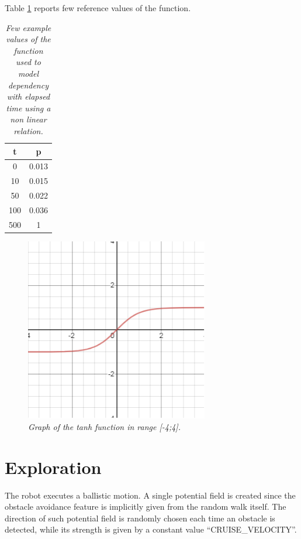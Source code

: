 \noindent
Table \ref{tab:f-values} reports few reference values of the function.

\begin{table}[H]
\centering
\begin{tabular}{| c | c |}

\hline
t & p \\
\hline
 0  & 0.013 \\
 10 & 0.015 \\
 50 & 0.022 \\
100 & 0.036 \\
500 & 1 \\
\hline

\end{tabular}
\caption{\label{tab:f-values}\textit{Few example values of the function used to model dependency with elapsed time using a non linear relation.}}
\end{table}

\begin{figure}[H]
\centering
\includegraphics[width=8cm, keepaspectratio]{images/tanh.png}
\caption{\textit{Graph of the tanh function in range [-4;4].}}
\label{fig:tanh}
\end{figure}

\section{Exploration}

The robot executes a ballistic motion. A single potential field is created since the obstacle avoidance feature is implicitly given from the random walk itself. The direction of such potential field is randomly chosen each time an obstacle is detected, while its strength is given by a constant value ``CRUISE\_VELOCITY''. 

